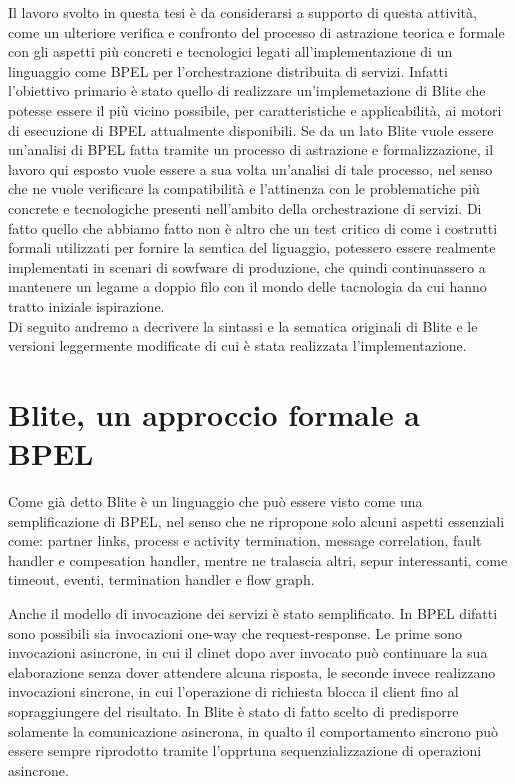 Il lavoro svolto in questa tesi è da considerarsi a supporto di questa attività,
come un ulteriore verifica e confronto del processo di astrazione teorica e
formale con gli aspetti più concreti e tecnologici legati all'implementazione di
un linguaggio come BPEL per l'orchestrazione distribuita di servizi. Infatti
l'obiettivo primario è stato quello di realizzare un'implemetazione di Blite che
potesse essere il più vicino possibile, per caratteristiche e applicabilità, ai
motori di esecuzione di BPEL attualmente disponibili. Se da un lato Blite vuole
essere un'analisi di BPEL fatta tramite un processo di astrazione e
formalizzazione, il lavoro qui esposto vuole essere a sua volta un'analisi di
tale processo, nel senso che ne vuole verificare la compatibilità e l'attinenza
con le problematiche più concrete e tecnologiche presenti nell'ambito della
orchestrazione di servizi. Di fatto quello che abbiamo fatto non è altro che un
test critico di come i costrutti formali utilizzati per fornire la semtica del
liguaggio, potessero essere realmente implementati in scenari di sowfware di
produzione, che quindi continuassero a mantenere un legame a doppio filo con il
mondo delle tacnologia da cui hanno tratto iniziale ispirazione.
\\

Di seguito andremo a decrivere la sintassi e  la sematica originali di Blite e
le versioni leggermente modificate di cui è stata realizzata l'implementazione.

\section{Blite, un approccio formale a BPEL}

Come già detto Blite è un linguaggio che può essere visto come una
semplificazione di BPEL, nel senso che ne ripropone solo alcuni aspetti
essenziali come: partner links, process e activity termination, message
correlation, fault handler e compesation handler, mentre ne tralascia altri,
sepur interessanti, come timeout, eventi, termination handler e flow graph. 

Anche il modello di invocazione dei servizi è stato semplificato. In BPEL difatti
sono possibili sia invocazioni one-way che request-response. Le prime sono
invocazioni asincrone, in cui il clinet dopo aver invocato può continuare la sua
elaborazione senza dover attendere alcuna risposta, le seconde invece realizzano
invocazioni sincrone, in cui l'operazione di richiesta blocca il client fino al
sopraggiungere del risultato. In Blite è stato di fatto scelto di predisporre
solamente la comunicazione asincrona, in qualto il comportamento sincrono può
essere sempre riprodotto tramite l'opprtuna sequenzializzazione di operazioni
asincrone.

